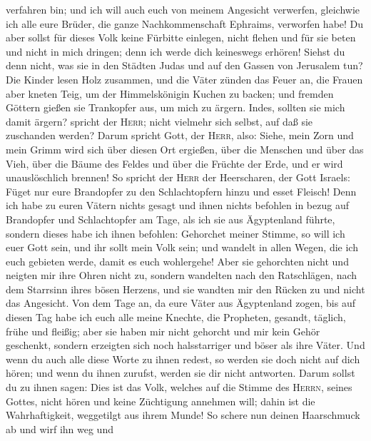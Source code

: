 verfahren bin;  und ich will auch euch von meinem
Angesicht verwerfen, gleichwie ich alle eure Brüder, die ganze
Nachkommenschaft Ephraims, verworfen habe!  Du aber
sollst für dieses Volk keine Fürbitte einlegen, nicht flehen und für sie
beten und nicht in mich dringen; denn ich werde dich keineswegs erhören!
 Siehst du denn nicht, was sie in den Städten Judas und
auf den Gassen von Jerusalem tun?  Die Kinder lesen Holz
zusammen, und die Väter zünden das Feuer an, die Frauen aber kneten
Teig, um der Himmelskönigin Kuchen zu backen; und fremden Göttern gießen
sie Trankopfer aus, um mich zu ärgern.  Indes, sollten
sie mich damit ärgern? spricht der \textsc{Herr}; nicht vielmehr sich
selbst, auf daß sie zuschanden werden?  Darum spricht
Gott, der \textsc{Herr}, also: Siehe, mein Zorn und mein Grimm wird sich
über diesen Ort ergießen, über die Menschen und über das Vieh, über die
Bäume des Feldes und über die Früchte der Erde, und er wird
unauslöschlich brennen!  So spricht der \textsc{Herr} der
Heerscharen, der Gott Israels: Füget nur eure Brandopfer zu den
Schlachtopfern hinzu und esset Fleisch!  Denn ich habe zu
euren Vätern nichts gesagt und ihnen nichts befohlen in bezug auf
Brandopfer und Schlachtopfer am Tage, als ich sie aus Ägyptenland
führte,  sondern dieses habe ich ihnen befohlen:
Gehorchet meiner Stimme, so will ich euer Gott sein, und ihr sollt mein
Volk sein; und wandelt in allen Wegen, die ich euch gebieten werde,
damit es euch wohlergehe!  Aber sie gehorchten nicht und
neigten mir ihre Ohren nicht zu, sondern wandelten nach den Ratschlägen,
nach dem Starrsinn ihres bösen Herzens, und sie wandten mir den Rücken
zu und nicht das Angesicht.  Von dem Tage an, da eure
Väter aus Ägyptenland zogen, bis auf diesen Tag habe ich euch alle meine
Knechte, die Propheten, gesandt, täglich, frühe und fleißig;
 aber sie haben mir nicht gehorcht und mir kein Gehör
geschenkt, sondern erzeigten sich noch halsstarriger und böser als ihre
Väter.  Und wenn du auch alle diese Worte zu ihnen
redest, so werden sie doch nicht auf dich hören; und wenn du ihnen
zurufst, werden sie dir nicht antworten.  Darum sollst du
zu ihnen sagen: Dies ist das Volk, welches auf die Stimme des
\textsc{Herrn}, seines Gottes, nicht hören und keine Züchtigung annehmen
will; dahin ist die Wahrhaftigkeit, weggetilgt aus ihrem Munde!
 So schere nun deinen Haarschmuck ab und wirf ihn weg und
